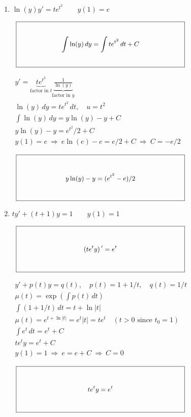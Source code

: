 \documentclass[12pt,letterpaper]{article}
\newcommand{\KeyBox}[3]{%
  \vcenter{\hbox{$\boxed{\parbox[c][#2][c]{#1}{\centering\small
    \setlength{\arraycolsep}{3pt}\renewcommand{\arraystretch}{0.95}%
    \ensuremath{\displaystyle #3}}}$}}}
\begin{document}
\begin{enumerate}
\noindent{}\ $\KeyBox{3.2in}{0.80in}{\arctan(y)=\sin(t^2)}$\par
\newpage
\item {}\qquad $\ln(y)y'=t e^{t^2}\qquad y(1)=e$

\par\noindent{}\ $\KeyBox{3.2in}{0.80in}{\displaystyle\int\ln(y)\,dy=\int t e^{t^2}\,dt+C}$\par
\hfill{\footnotesize $\begin{gathered}
y'=\underbrace{t e^{t^2}}_{\text{factor in }t}\underbrace{\frac{1}{\ln(y)}}_{\text{factor in }y}\\
\ln(y)\,dy=t e^{t^2}\,dt,\quad u=t^2\\
\int\ln(y)\,dy=y\ln(y)-y+C\\
y\ln(y)-y=e^{t^2}/2+C\\
y(1)=e\ \Longrightarrow\ e\ln(e)-e=e/2+C\ \Longrightarrow\ C=-e/2
\end{gathered}$}
\vfill

\noindent{}\ $\KeyBox{3.2in}{0.80in}{y\ln(y)-y=(e^{t^2}-e)/2}$\par
\item {}\qquad $ty'+(t+1)y=1\qquad y(1)=1$

\par\noindent{}\ $\KeyBox{3.2in}{0.80in}{(t e^t y)\,{}^{\prime}=e^t}$\par
{}

\hfill{\footnotesize $\begin{gathered}
y'+p(t)y=q(t),\quad p(t)=1+1/t,\quad q(t)=1/t\\
\mu(t)=\exp\!\left(\int p(t)\,dt\right)\\
\int (1+1/t)\,dt=t+\ln|t|\\
\mu(t)=e^{t+\ln|t|}=e^t|t|=t e^t\quad(t>0\text{ since }t_0=1)\\
\int e^t\,dt=e^t+C\\
t e^t y=e^t+C\\
y(1)=1\ \Longrightarrow\ e=e+C\ \Longrightarrow\ C=0
\end{gathered}$}
\vfill

\noindent{}\ $\KeyBox{3.2in}{0.80in}{t e^t y=e^t}$\par
\end{enumerate}
\end{document}
